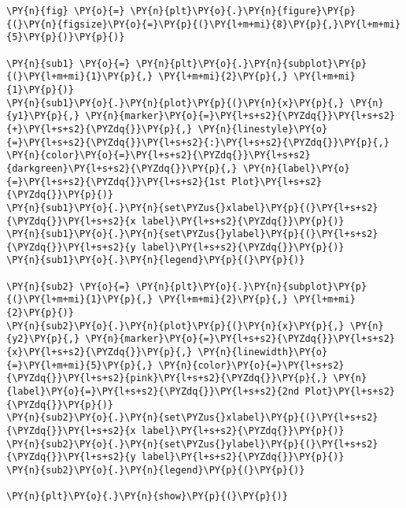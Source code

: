     \begin{tcolorbox}[breakable, size=fbox, boxrule=1pt, pad at break*=1mm,colback=cellbackground, colframe=cellborder]
\begin{Verbatim}[commandchars=\\\{\}]
\PY{n}{fig} \PY{o}{=} \PY{n}{plt}\PY{o}{.}\PY{n}{figure}\PY{p}{(}\PY{n}{figsize}\PY{o}{=}\PY{p}{(}\PY{l+m+mi}{8}\PY{p}{,}\PY{l+m+mi}{5}\PY{p}{)}\PY{p}{)}

\PY{n}{sub1} \PY{o}{=} \PY{n}{plt}\PY{o}{.}\PY{n}{subplot}\PY{p}{(}\PY{l+m+mi}{1}\PY{p}{,} \PY{l+m+mi}{2}\PY{p}{,} \PY{l+m+mi}{1}\PY{p}{)}
\PY{n}{sub1}\PY{o}{.}\PY{n}{plot}\PY{p}{(}\PY{n}{x}\PY{p}{,} \PY{n}{y1}\PY{p}{,} \PY{n}{marker}\PY{o}{=}\PY{l+s+s2}{\PYZdq{}}\PY{l+s+s2}{+}\PY{l+s+s2}{\PYZdq{}}\PY{p}{,} \PY{n}{linestyle}\PY{o}{=}\PY{l+s+s2}{\PYZdq{}}\PY{l+s+s2}{:}\PY{l+s+s2}{\PYZdq{}}\PY{p}{,} \PY{n}{color}\PY{o}{=}\PY{l+s+s2}{\PYZdq{}}\PY{l+s+s2}{darkgreen}\PY{l+s+s2}{\PYZdq{}}\PY{p}{,} \PY{n}{label}\PY{o}{=}\PY{l+s+s2}{\PYZdq{}}\PY{l+s+s2}{1st Plot}\PY{l+s+s2}{\PYZdq{}}\PY{p}{)}
\PY{n}{sub1}\PY{o}{.}\PY{n}{set\PYZus{}xlabel}\PY{p}{(}\PY{l+s+s2}{\PYZdq{}}\PY{l+s+s2}{x label}\PY{l+s+s2}{\PYZdq{}}\PY{p}{)}
\PY{n}{sub1}\PY{o}{.}\PY{n}{set\PYZus{}ylabel}\PY{p}{(}\PY{l+s+s2}{\PYZdq{}}\PY{l+s+s2}{y label}\PY{l+s+s2}{\PYZdq{}}\PY{p}{)}
\PY{n}{sub1}\PY{o}{.}\PY{n}{legend}\PY{p}{(}\PY{p}{)}

\PY{n}{sub2} \PY{o}{=} \PY{n}{plt}\PY{o}{.}\PY{n}{subplot}\PY{p}{(}\PY{l+m+mi}{1}\PY{p}{,} \PY{l+m+mi}{2}\PY{p}{,} \PY{l+m+mi}{2}\PY{p}{)}
\PY{n}{sub2}\PY{o}{.}\PY{n}{plot}\PY{p}{(}\PY{n}{x}\PY{p}{,} \PY{n}{y2}\PY{p}{,} \PY{n}{marker}\PY{o}{=}\PY{l+s+s2}{\PYZdq{}}\PY{l+s+s2}{x}\PY{l+s+s2}{\PYZdq{}}\PY{p}{,} \PY{n}{linewidth}\PY{o}{=}\PY{l+m+mi}{5}\PY{p}{,} \PY{n}{color}\PY{o}{=}\PY{l+s+s2}{\PYZdq{}}\PY{l+s+s2}{pink}\PY{l+s+s2}{\PYZdq{}}\PY{p}{,} \PY{n}{label}\PY{o}{=}\PY{l+s+s2}{\PYZdq{}}\PY{l+s+s2}{2nd Plot}\PY{l+s+s2}{\PYZdq{}}\PY{p}{)}
\PY{n}{sub2}\PY{o}{.}\PY{n}{set\PYZus{}xlabel}\PY{p}{(}\PY{l+s+s2}{\PYZdq{}}\PY{l+s+s2}{x label}\PY{l+s+s2}{\PYZdq{}}\PY{p}{)}
\PY{n}{sub2}\PY{o}{.}\PY{n}{set\PYZus{}ylabel}\PY{p}{(}\PY{l+s+s2}{\PYZdq{}}\PY{l+s+s2}{y label}\PY{l+s+s2}{\PYZdq{}}\PY{p}{)}
\PY{n}{sub2}\PY{o}{.}\PY{n}{legend}\PY{p}{(}\PY{p}{)}

\PY{n}{plt}\PY{o}{.}\PY{n}{show}\PY{p}{(}\PY{p}{)}
\end{Verbatim}
\end{tcolorbox}

    \begin{center}
    \end{center}
    { \hspace*{\fill} \\}
    
